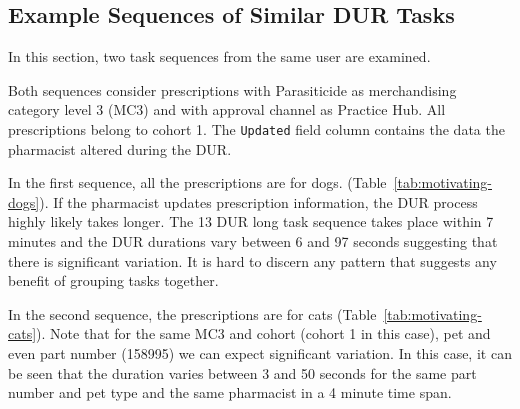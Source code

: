 \subsection{Example Sequences of Similar DUR Tasks}
In this section, two task sequences from the same user are examined.

Both sequences consider prescriptions with Parasiticide as merchandising category level 3 (MC3)  and with  approval channel as Practice Hub. All prescriptions belong to cohort 1. The \texttt{Updated} field column contains the data the pharmacist altered during the DUR.

In the first sequence, all the prescriptions are for dogs. (Table~\ref{tab:motivating-dogs}). If the pharmacist updates prescription information, the DUR process highly likely takes longer. The 13 DUR long task sequence takes place within 7 minutes and the DUR durations vary between 6 and 97 seconds suggesting that there is significant variation. It is hard to discern any pattern that suggests any benefit of grouping tasks together.

In the second sequence, the prescriptions are for cats (Table~\ref{tab:motivating-cats}). Note that for the same MC3 and cohort (cohort 1 in this case), pet and even part number (158995) we can expect significant variation. In this case, it can be seen that the duration varies between 3 and 50 seconds for the same part number and pet type and  the same pharmacist in a 4 minute time span.

